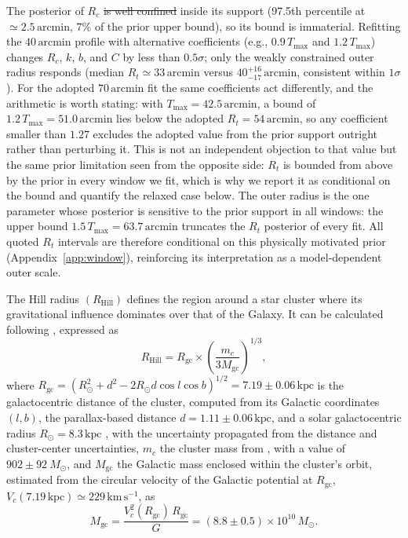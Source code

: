\documentclass{aa}
\providecommand{\DIFaddtex}[1]{{\protect\color{red}\uwave{#1}}} %
\providecommand{\DIFdeltex}[1]{{\protect\color{red}\sout{#1}}} %
\providecommand{\DIFaddbegin}{} %
\providecommand{\DIFaddend}{} %
\providecommand{\DIFdelbegin}{} %
\providecommand{\DIFdelend}{} %
\providecommand{\DIFadd}[1]{\texorpdfstring{\DIFaddtex{#1}}{#1}} %
\providecommand{\DIFdel}[1]{\texorpdfstring{\DIFdeltex{#1}}{}} %
\providecommand{\DIFscaledelfig}{0.5}
\newlength{\DIFdelgraphicswidth} %
\newlength{\DIFdelgraphicsheight} %
\providecommand{\DIFaddincludegraphics}[2][]{{\color{blue}\fbox{\DIFOincludegraphics[#1]{#2}}}} %
\providecommand{\DIFdelincludegraphics}[2][]{%
\sbox{\DIFdelgraphicsbox}{\DIFOincludegraphics[#1]{#2}}%
\settoboxwidth{\DIFdelgraphicswidth}{\DIFdelgraphicsbox} %
\settoboxtotalheight{\DIFdelgraphicsheight}{\DIFdelgraphicsbox} %
\scalebox{\DIFscaledelfig}{%
\parbox[b]{\DIFdelgraphicswidth}{\usebox{\DIFdelgraphicsbox}\\[-\baselineskip] \rule{\DIFdelgraphicswidth}{0em}}\llap{\resizebox{\DIFdelgraphicswidth}{\DIFdelgraphicsheight}{%
\setlength{\unitlength}{\DIFdelgraphicswidth}%
\begin{picture}(1,1)%
\thicklines\linethickness{2pt} %
{\color[rgb]{1,0,0}\put(0,0){\framebox(1,1){}}}%
{\color[rgb]{1,0,0}\put(0,0){\line( 1,1){1}}}%
{\color[rgb]{1,0,0}\put(0,1){\line(1,-1){1}}}%
\end{picture}%
}\hspace*{3pt}}} %
} %
\DeclareRobustCommand{\DIFaddbegin}{\DIFOaddbegin \let\includegraphics\DIFaddincludegraphics} %
\DeclareRobustCommand{\DIFaddend}{\DIFOaddend \let\includegraphics\DIFOincludegraphics} %
\DeclareRobustCommand{\DIFdelbegin}{\DIFOdelbegin \let\includegraphics\DIFdelincludegraphics} %
\DeclareRobustCommand{\DIFdelend}{\DIFOaddend \let\includegraphics\DIFOincludegraphics} %
\begin{document}
The posterior of $R_c$ \DIFdelbegin \DIFdel{is well confined }\DIFdelend \DIFaddbegin \DIFadd{lies well }\DIFaddend inside its support (97.5th percentile at $\simeq2.5\,\mathrm{arcmin}$, $7\%$ of the prior upper bound), so its bound is immaterial. Refitting the $40\,\mathrm{arcmin}$ profile with alternative coefficients (e.g., $0.9\,T_{\mathrm{max}}$ and $1.2\,T_{\mathrm{max}}$) changes $R_c$, $k$, $b$, and $C$ by less than $0.5\sigma$; only the weakly constrained outer radius responds (median $R_t\simeq33\,\mathrm{arcmin}$ versus $40^{+16}_{-17}\,\mathrm{arcmin}$, consistent within $1\sigma$). For the adopted $70\,\mathrm{arcmin}$ fit the same coefficients act differently, and the arithmetic is worth stating: with $T_{\mathrm{max}}=42.5\,\mathrm{arcmin}$, a bound of $1.2\,T_{\mathrm{max}}=51.0\,\mathrm{arcmin}$ lies below the adopted $R_t=54\,\mathrm{arcmin}$, so any coefficient smaller than $1.27$ excludes the adopted value from the prior support outright rather than perturbing it. This is not an independent objection to that value but the same prior limitation seen from the opposite side: $R_t$ is bounded from above by the prior in every window we fit, which is why we report it as conditional on the bound and quantify the relaxed case below. The outer radius is the one parameter whose posterior is sensitive to the prior support in all windows: the upper bound $1.5\,T_{\mathrm{max}}=63.7\,\mathrm{arcmin}$ truncates the $R_t$ posterior of every fit. All quoted $R_t$ intervals are therefore conditional on this physically motivated prior (Appendix~\ref{app:window}), reinforcing its interpretation as a model-dependent outer scale.

The Hill radius $(R_\mathrm{Hill})$ defines the region around a star cluster where its gravitational influence dominates over that of the Galaxy. It can be calculated following \citet{2019A&A...627A.119C}, expressed as
\begin{equation}
R_\mathrm{Hill} = R_{\mathrm{gc}} \times \left(\frac{m_c}{3M_{\mathrm{gc}}}\right)^{1/3},
\end{equation}
where $R_{\mathrm{gc}} = \left(R_\odot^{2} + d^{2} - 2 R_\odot d \cos l \cos b\right)^{1/2} = 7.19 \pm 0.06\,\mathrm{kpc}$ is the galactocentric distance of the cluster, computed from its Galactic coordinates $(l,b)$, the parallax-based distance $d = 1.11 \pm 0.06\,\mathrm{kpc}$, and a solar galactocentric radius $R_\odot = 8.3\,\mathrm{kpc}$ \citep{2016ApJS..227....5D}, with the uncertainty propagated from the distance and cluster-center uncertainties, $ m_c $ the cluster mass from \citet{2024arXiv240305143H}, with a value of $902 \pm 92~M_\odot$, and $ M_{\mathrm{gc}} $ the Galactic mass enclosed within the cluster's orbit, estimated from the circular velocity of the \citet{2017MNRAS.465...76M} Galactic potential at $R_{\mathrm{gc}}$, $V_c(7.19\,\mathrm{kpc}) \simeq 229\,\mathrm{km\,s^{-1}}$, as
\begin{equation}
	M_{\mathrm{gc}} = \frac{V_c^2(R_{\mathrm{gc}})\, R_{\mathrm{gc}}}{G} = (8.8 \pm 0.5) \times 10^{10}\,M_\odot.
\end{equation}
\end{document}
